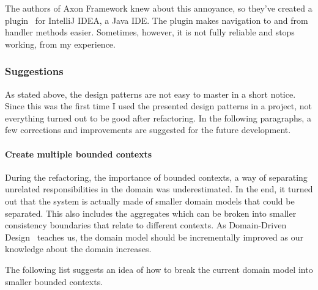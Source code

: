 \documentclass{book}
\begin{document}
The authors of Axon Framework knew about this annoyance, so they've
created a plugin~\cite{idea-plugin} for IntelliJ IDEA, a Java IDE. The
plugin makes navigation to and from handler methods easier. Sometimes,
however, it is not fully reliable and stops working, from my experience.


\subsubsection{Suggestions}\label{suggestions}

As stated above, the design patterns are not easy to master in a short
notice. Since this was the first time I used the presented design
patterns in a project, not everything turned out to be good after
refactoring. In the following paragraphs, a few corrections and
improvements are suggested for the future development.

\paragraph{Create multiple bounded
contexts}\label{create-multiple-bounded-contexts}

During the refactoring, the importance of bounded contexts, a way of
separating unrelated responsibilities in the domain was underestimated.
In the end, it turned out that the system is actually made of smaller
domain models that could be separated. This also includes the aggregates
which can be broken into smaller consistency boundaries that relate to
different contexts. As Domain-Driven Design~\cite{ddd} teaches us, the
domain model should be incrementally improved as our knowledge about the
domain increases.

The following list suggests an idea of how to break the current domain
model into smaller bounded contexts.
\end{document}
